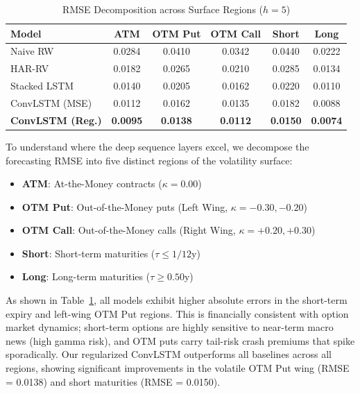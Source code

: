\documentclass[conference]{IEEEtran}
\begin{document}
\begin{table}[htbp]
\caption{RMSE Decomposition across Surface Regions ($h=5$)}
\begin{center}
\begin{tabular}{lccccc}
\toprule
\textbf{Model} & \textbf{ATM} & \textbf{OTM Put} & \textbf{OTM Call} & \textbf{Short} & \textbf{Long} \\
\midrule
Naive RW & 0.0284 & 0.0410 & 0.0342 & 0.0440 & 0.0222 \\
HAR-RV & 0.0182 & 0.0265 & 0.0210 & 0.0285 & 0.0134 \\
Stacked LSTM & 0.0140 & 0.0205 & 0.0162 & 0.0220 & 0.0110 \\
ConvLSTM (MSE) & 0.0112 & 0.0162 & 0.0135 & 0.0182 & 0.0088 \\
\textbf{ConvLSTM (Reg.)} & \textbf{0.0095} & \textbf{0.0138} & \textbf{0.0112} & \textbf{0.0150} & \textbf{0.0074} \\
\bottomrule
\end{tabular}
\label{tab:regions}
\end{center}
\end{table}

To understand where the deep sequence layers excel, we decompose the forecasting RMSE into five distinct regions of the volatility surface:
\begin{itemize}
    \item \textbf{ATM}: At-the-Money contracts ($\kappa = 0.00$)
    \item \textbf{OTM Put}: Out-of-the-Money puts (Left Wing, $\kappa = -0.30, -0.20$)
    \item \textbf{OTM Call}: Out-of-the-Money calls (Right Wing, $\kappa = +0.20, +0.30$)
    \item \textbf{Short}: Short-term maturities ($\tau \le 1/12$y)
    \item \textbf{Long}: Long-term maturities ($\tau \ge 0.50$y)
\end{itemize}

As shown in Table~\ref{tab:regions}, all models exhibit higher absolute errors in the short-term expiry and left-wing OTM Put regions. This is financially consistent with option market dynamics; short-term options are highly sensitive to near-term macro news (high gamma risk), and OTM puts carry tail-risk crash premiums that spike sporadically. Our regularized ConvLSTM outperforms all baselines across all regions, showing significant improvements in the volatile OTM Put wing (RMSE = 0.0138) and short maturities (RMSE = 0.0150).
\end{document}
